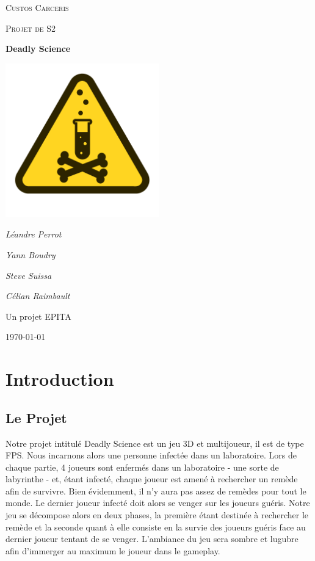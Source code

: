 \documentclass{article}
\begin{document}
\begin{titlepage}
	\centering
	{\scshape\LARGE Custos Carceris\par}
	\vspace{1cm}
	{\scshape\Large Projet de S2\par}
	\vspace{1.5cm}
	{\huge\bfseries Deadly Science\par}
	\vspace{2cm}
	\includegraphics[width=0.5\textwidth]{logo.png}\par\vspace{1cm}
	{\Large\itshape Léandre Perrot\par}
	{\Large\itshape Yann Boudry\par}
	{\Large\itshape Steve Suissa\par}
	{\Large\itshape Célian Raimbault\par}
	\vfill
	Un projet EPITA
	\vfill
	{\large \today\par}
\end{titlepage}



\newpage
\tableofcontents


\newpage
\section{Introduction}
\subsection{Le Projet}

Notre projet intitulé Deadly Science est un jeu 3D et multijoueur, il est de type FPS. Nous incarnons alors une personne infectée dans un laboratoire. Lors de chaque partie, 4 joueurs sont enfermés dans un laboratoire - une sorte de labyrinthe - et, étant infecté, chaque joueur est amené à rechercher un remède afin de survivre. Bien évidemment, il n’y aura pas assez de remèdes pour tout le monde. Le dernier joueur infecté doit alors se venger sur les joueurs guéris. Notre jeu se décompose alors en deux phases, la première étant destinée à rechercher le remède et la seconde quant à elle consiste en la survie des joueurs guéris face au dernier joueur tentant de se venger. L’ambiance du jeu sera sombre et lugubre afin d’immerger au maximum le joueur dans le gameplay. 
\end{document}
